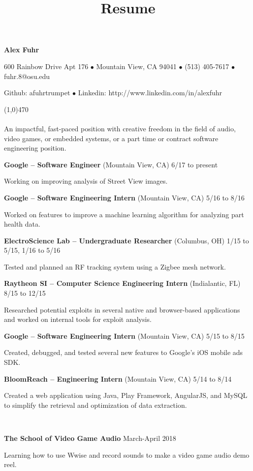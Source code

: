 \documentclass[10pt]{article}
\title{Resume}
\begin{document}
\centerline{{\LARGE \bf Alex Fuhr}}
\centerline{600 Rainbow Drive Apt 176 $\bullet$ Mountain View, CA 94041 $\bullet$ (513) 405-7617 $\bullet$ fuhr.8@osu.edu}
\centerline{Github: afuhrtrumpet $\bullet$ Linkedin: http://www.linkedin.com/in/alexfuhr}
\noindent
\line(1,0){470}\\

\\
\smallskip
\noindent
An impactful, fast-paced position with creative freedom in the field of audio, video games, or embedded systems, or a part time or contract software engineering position.
\medskip

\smallskip

\centerline{{\large {\bf Google -- Software Engineer} (Mountain View, CA) \hfill 6/17 to present}}
\noindent
Working on improving analysis of Street View images.
\smallskip

\centerline{{\large {\bf Google -- Software Engineering Intern} (Mountain View, CA) \hfill 5/16 to 8/16}}
\noindent
Worked on features to improve a machine learning algorithm for analyzing part health data.
\smallskip

\centerline{{\large {\bf ElectroScience Lab -- Undergraduate Researcher} (Columbus, OH) \hfill 1/15 to 5/15, 1/16 to 5/16}}
\noindent
Tested and planned an RF tracking system using a Zigbee mesh network.
\smallskip

\centerline{{\large {\bf Raytheon SI -- Computer Science Engineering Intern} (Indialantic, FL) \hfill 8/15 to 12/15}}
\noindent
Researched potential exploits in several native and browser-based applications and worked on internal tools for exploit analysis.
\smallskip

\centerline{{\large {\bf Google -- Software Engineering Intern} (Mountain View, CA) \hfill 5/15 to 8/15}}
\noindent
Created, debugged, and tested several new features to Google's iOS mobile ads SDK.
\smallskip

\centerline{{\large {\bf BloomReach -- Engineering Intern} (Mountain View, CA) \hfill 5/14 to 8/14}}
\noindent
Created a web application using Java, Play Framework, AngularJS, and MySQL to simplify the retrieval and optimization of data extraction.
\medskip

\\
\smallskip
\centerline{{\large {\bf The School of Video Game Audio} \hfill March-April 2018}}
\noindent
Learning how to use Wwise and record sounds to make a video game audio demo reel.
\medskip
\end{document}
